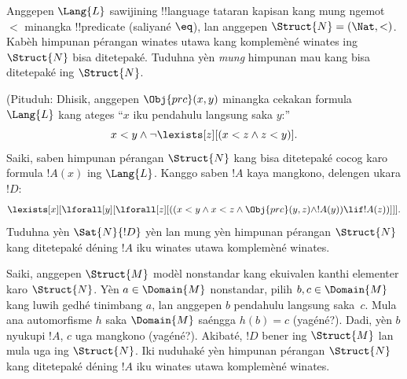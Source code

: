 \documentclass[../../../include/open-logic-section]{subfiles}
\begin{document}
\begin{prob} 
Anggepen $\Lang{L}$ sawijining !!{language} tataran kapisan
kang mung ngemot $<$ minangka !!{predicate}
(saliyané $\eq$), lan anggepen $\Struct{N} = (\Nat, <)$.
Kabèh himpunan pérangan winates utawa kang komplemèné
winates ing $\Struct{N}$ bisa ditetepaké.
Tuduhna yèn \emph{mung} himpunan mau kang bisa ditetepaké
ing $\Struct{N}$.
 
(Pituduh: Dhisik, anggepen $\Obj{prc}(x,y)$ minangka
cekakan formula $\Lang{L}$ kang ateges ``$x$ iku
pendahulu langsung saka $y$:''
\[
x<y \land \lnot \lexists[z][(x<z \land z < y)].
\]
Saiki, saben himpunan pérangan $\Struct{N}$ kang bisa
ditetepaké cocog karo formula $!A(x)$ ing $\Lang{L}$.
Kanggo saben $!A$ kaya mangkono, delengen ukara $!D$:
\[
\lexists[x][\lforall[y][\lforall[z][((x<y \land x<z \land \Obj{prc}(y,z)
  \land !A(y)) \lif !A(z))]]].
\]
Tuduhna yèn $\Sat{N}{!D}$ yèn lan mung yèn
himpunan pérangan $\Struct{N}$ kang ditetepaké déning
$!A$ iku winates utawa komplemèné winates.

Saiki, anggepen $\Struct{M}$ modèl nonstandar kang
ekuivalen kanthi elementer karo $\Struct{N}$.
Yèn $a \in \Domain{M}$ nonstandar, pilih
$b, c \in \Domain{M}$ kang luwih gedhé tinimbang $a$,
lan anggepen $b$ pendahulu langsung saka~$c$.
Mula ana automorfisme $h$ saka $\Domain{M}$
saéngga $h(b)=c$ (yagéné?).
Dadi, yèn $b$ nyukupi $!A$, $c$ uga mangkono
(yagéné?). Akibaté, $!D$ bener ing
$\Struct{M}$ lan mula uga ing $\Struct{N}$.
Iki nuduhaké yèn himpunan pérangan $\Struct{N}$
kang ditetepaké déning $!A$ iku winates utawa
komplemèné winates.
\end{prob}
\end{document}
